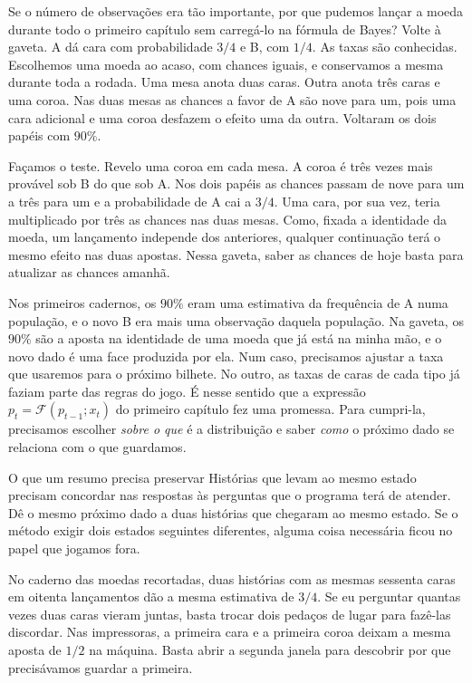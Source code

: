 Se o número de observações era tão importante, por que pudemos lançar a moeda durante todo o primeiro capítulo sem carregá-lo na fórmula de Bayes? Volte à gaveta. A dá cara com probabilidade $3/4$ e B, com $1/4$. As taxas são conhecidas. Escolhemos uma moeda ao acaso, com chances iguais, e conservamos a mesma durante toda a rodada. Uma mesa anota duas caras. Outra anota três caras e uma coroa. Nas duas mesas as chances a favor de A são nove para um, pois uma cara adicional e uma coroa desfazem o efeito uma da outra. Voltaram os dois papéis com $90\%$.

Façamos o teste. Revelo uma coroa em cada mesa. A coroa é três vezes mais provável sob B do que sob A. Nos dois papéis as chances passam de nove para um a três para um e a probabilidade de A cai a $3/4$. Uma cara, por sua vez, teria multiplicado por três as chances nas duas mesas. Como, fixada a identidade da moeda, um lançamento independe dos anteriores, qualquer continuação terá o mesmo efeito nas duas apostas. Nessa gaveta, saber as chances de hoje basta para atualizar as chances amanhã.

Nos primeiros cadernos, os $90\%$ eram uma estimativa da frequência de A numa população, e o novo B era mais uma observação daquela população. Na gaveta, os $90\%$ são a aposta na identidade de uma moeda que já está na minha mão, e o novo dado é uma face produzida por ela. Num caso, precisamos ajustar a taxa que usaremos para o próximo bilhete. No outro, as taxas de caras de cada tipo já faziam parte das regras do jogo. É nesse sentido que a expressão $p_t=\mathcal F(p_{t-1};x_t)$ do primeiro capítulo fez uma promessa. Para cumpri-la, precisamos escolher \emph{sobre o que} é a distribuição e saber \emph{como} o próximo dado se relaciona com o que guardamos.

\begin{quadro}{O que um resumo precisa preservar}
 Histórias que levam ao mesmo estado precisam concordar nas respostas às perguntas que o programa terá de atender.
 Dê o mesmo próximo dado a duas histórias que chegaram ao mesmo estado. Se o método exigir dois estados seguintes diferentes, alguma coisa necessária ficou no papel que jogamos fora.
\end{quadro}

No caderno das moedas recortadas, duas histórias com as mesmas sessenta caras em oitenta lançamentos dão a mesma estimativa de $3/4$. Se eu perguntar quantas vezes duas caras vieram juntas, basta trocar dois pedaços de lugar para fazê-las discordar. Nas impressoras, a primeira cara e a primeira coroa deixam a mesma aposta de $1/2$ na máquina. Basta abrir a segunda janela para descobrir por que precisávamos guardar a primeira.

